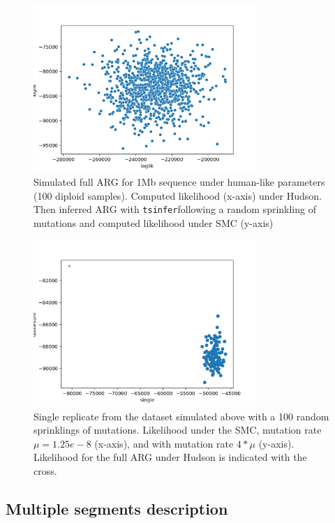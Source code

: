 \documentclass{article}
\newcommand{\tsinfer}[0]{\texttt{tsinfer}}
\begin{document}
\begin{figure}[!ht]
\centering
\includegraphics[width=0.75\textwidth]{figures/supplementary-figs/hudson_liks_vs_tsinfer_smc.png}
\caption{Simulated full ARG for 1Mb sequence under human-like parameters (100 diploid samples). Computed likelihood (x-axis) under Hudson. Then inferred ARG with \tsinfer following a random sprinkling of mutations and computed likelihood under SMC (y-axis)}
 \label{sup:fig:hudson-smc}
\end{figure}

\begin{figure}[!ht]
\centering
\includegraphics[width=0.75\textwidth]{figures/supplementary-figs/single_rep_human_like_1gb.png}
\caption{Single replicate from the dataset simulated above with a 100 random sprinklings of mutations. Likelihood under the SMC, mutation rate $\mu=1.25e-8$ (x-axis), and with mutation rate $4*\mu$ (y-axis). Likelihood for the full ARG under Hudson is indicated with the cross.}
 \label{sup:fig:single-tsinfer}
\end{figure}

\subsection{Multiple segments description}
\end{document}
